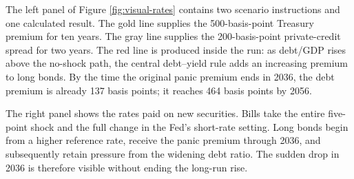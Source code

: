 \documentclass[11pt]{article}
\begin{document}
The left panel of Figure \ref{fig:visual-rates} contains two scenario instructions and one
calculated result.  The gold line supplies the 500-basis-point Treasury premium for ten years.
The gray line supplies the 200-basis-point private-credit spread for two years.  The red line
is produced inside the run: as debt/GDP rises above the no-shock path, the central debt--yield
rule adds an increasing premium to long bonds.  By the time the original panic premium ends
in 2036, the debt premium is already 137 basis points; it reaches 464 basis points by 2056.

The right panel shows the rates paid on new securities.  Bills take the entire five-point
shock and the full change in the Fed's short-rate setting.  Long bonds begin from a higher
reference rate, receive the panic premium through 2036, and subsequently retain pressure from
the widening debt ratio.  The sudden drop in 2036 is therefore visible without ending the
long-run rise.
\end{document}

